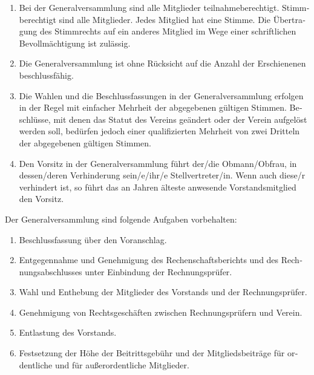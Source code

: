 \begin{otherlanguage}{german}
\begin{enumerate}[statutenenum]
    \item Bei der Generalversammlung sind alle Mitglieder teilnahmeberechtigt.
        Stimmberechtigt sind alle Mitglieder.
        Jedes Mitglied hat eine Stimme.
        Die Übertragung des Stimmrechts auf ein anderes Mitglied im Wege einer schriftlichen Bevollmächtigung ist zulässig.

    \item Die Generalversammlung ist ohne Rücksicht auf die Anzahl der Erschienenen beschlussfähig.

    \item Die Wahlen und die Beschlussfassungen in der Generalversammlung erfolgen in der Regel mit einfacher Mehrheit der abgegebenen gültigen Stimmen.
        Beschlüsse, mit denen das Statut des Vereins geändert oder der Verein aufgelöst werden soll, bedürfen jedoch einer qualifizierten Mehrheit von zwei Dritteln der abgegebenen gültigen Stimmen.

    \item Den Vorsitz in der Generalversammlung führt der/die Obmann/Obfrau, in dessen/deren Verhinderung sein/e/ihr/e Stellvertreter/in.
        Wenn auch diese/r verhindert ist, so führt das an Jahren älteste anwesende Vorstandsmitglied den Vorsitz.
\end{enumerate}


Der Generalversammlung sind folgende Aufgaben vorbehalten:

\begin{enumerate}[statutenenum]
    \item Beschlussfassung über den Voranschlag.

    \item Entgegennahme und Genehmigung des Rechenschaftsberichts und des Rechnungsabschlusses unter Einbindung der Rechnungsprüfer.

    \item Wahl und Enthebung der Mitglieder des Vorstands und der Rechnungsprüfer.

    \item Genehmigung von Rechtsgeschäften zwischen Rechnungsprüfern und Verein.

    \item Entlastung des Vorstands.

    \item Festsetzung der Höhe der Beitrittsgebühr und der Mitgliedsbeiträge für ordentliche und für außerordentliche Mitglieder.


\end{enumerate}
\end{otherlanguage}
